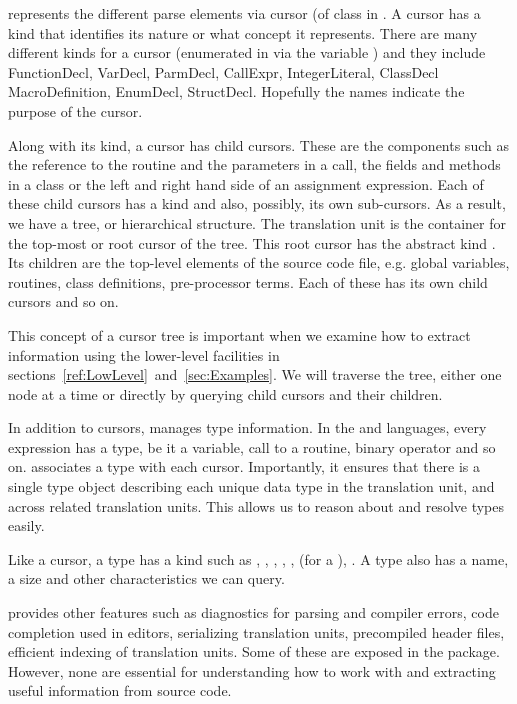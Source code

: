 \libclang{} represents the different parse elements via cursor (of
class  in \R.  A cursor has a kind that identifies
its nature or what concept it represents. There are many different
kinds for a cursor (enumerated in  via the variable
) and they include FunctionDecl, VarDecl, ParmDecl,
CallExpr, IntegerLiteral, ClassDecl MacroDefinition, EnumDecl,
StructDecl.  Hopefully the names indicate the purpose of the cursor.

Along with its kind, a cursor has child cursors.  These are the
components such as the reference to the routine and the parameters in
a call, the fields and methods in a \Cpp{} class or the left and right
hand side of an assignment expression. Each of these child cursors has
a kind and also, possibly, its own sub-cursors. As a result, we have a
tree, or hierarchical structure.  The translation unit is the
container for the top-most or root cursor of the tree.  This root
cursor has the abstract kind .  Its
children are the top-level elements of the source code file,
e.g. global variables, routines, class definitions, pre-processor
terms. Each of these has its own child cursors and so on.

This concept of a cursor tree is important when we examine how to
extract information using the lower-level facilities in
sections~\ref{ref:LowLevel}~and~\ref{sec:Examples}.  We will traverse
the tree, either one node at a time or directly by querying child
cursors and their children.

In addition to cursors, \libclang{} manages type information.  In the
\C{} and \Cpp{} languages, every expression has a type, be it a
variable, call to a routine, binary operator and so on.  \libclang{}
associates a type with each cursor.  Importantly, it ensures that
there is a single type object describing each unique data type in the
translation unit, and across related translation units.  This allows
us to reason about and resolve types easily.

Like a cursor, a type has a kind such as ,
, ,
, ,
 (for a ),
.  A type also has a name, a size and other
characteristics we can query.


\libclang{} provides other features such as diagnostics for parsing
and compiler errors, code completion used in editors, serializing
translation units, precompiled header files, efficient indexing of
translation units.  Some of these are exposed in the 
package. However, none are essential for understanding how to work
with \libclang{} and extracting useful information from source code.

